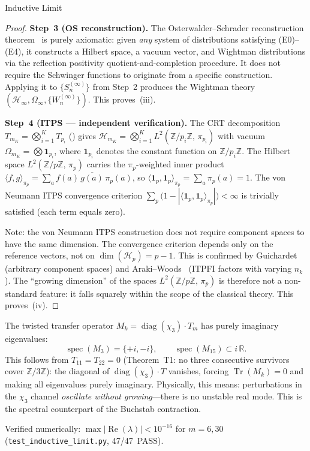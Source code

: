 \documentclass[12pt,a4paper]{article}
\begin{document}
\begin{thmbox}{Inductive Limit}
\begin{proof}
\textbf{Step~3 (OS reconstruction).}
The Osterwalder--Schrader reconstruction
theorem~\cite{OsterwalderSchrader1973,OsterwalderSchrader1975}
is purely axiomatic: given \emph{any} system of distributions
satisfying (E0)--(E4), it constructs a Hilbert space, a vacuum
vector, and Wightman distributions via the reflection positivity
quotient-and-completion procedure.  It does not require the Schwinger
functions to originate from a specific construction.
Applying it to $\{S_n^{(\infty)}\}$ from Step~2 produces
the Wightman theory $(\mathcal{H}_\infty, \Omega_\infty,
\{W_n^{(\infty)}\})$.  This proves~(iii).

\textbf{Step~4 (ITPS --- independent verification).}
The CRT decomposition $T_{m_K} = \bigotimes_{i=1}^K T_{p_i}$
(\cite{companion_M1})
gives $\mathcal{H}_{m_K} = \bigotimes_{i=1}^K
  L^2(\mathbb{Z}/p_i\mathbb{Z},\,\pi_{p_i})$
with vacuum $\Omega_{m_K} = \bigotimes \mathbf{1}_{p_i}$,
where $\mathbf{1}_{p_i}$ denotes the constant function on
$\mathbb{Z}/p_i\mathbb{Z}$.  The Hilbert space
$L^2(\mathbb{Z}/p\mathbb{Z},\,\pi_p)$ carries the
$\pi_p$-weighted inner product
$\langle f, g \rangle_{\pi_p} = \sum_{a} f(a)\,
  \overline{g(a)}\,\pi_p(a)$,
so $\langle \mathbf{1}_p, \mathbf{1}_p \rangle_{\pi_p}
  = \sum_a \pi_p(a) = 1$.
The von Neumann ITPS convergence criterion
$\sum_p \bigl(1 - |\langle \mathbf{1}_p, \mathbf{1}_p
  \rangle_{\pi_p}|\bigr) < \infty$
is trivially satisfied (each term equals zero).

Note: the von Neumann ITPS construction does not require component
spaces to have the same dimension.  The convergence criterion
depends only on the reference vectors, not on
$\dim(\mathcal{H}_p) = p - 1$.  This is confirmed by
Guichardet~\cite{Guichardet1966} (arbitrary component spaces) and
Araki--Woods~\cite{ArakiWoods1968} (ITPFI factors with varying
$n_k$).  The ``growing dimension'' of the spaces
$L^2(\mathbb{Z}/p\mathbb{Z},\,\pi_p)$ is therefore not a
non-standard feature: it falls squarely within the scope of the
classical theory.  This proves~(iv).
\end{proof}
\end{thmbox}

\begin{remark}\mBR
\label{rem:imag_spectrum}
The twisted transfer operator $M_k = \operatorname{diag}(\chi_3)
\cdot T_m$ has purely imaginary eigenvalues:
\[
  \operatorname{spec}(M_3) = \{+i, -i\},
  \qquad
  \operatorname{spec}(M_{15}) \subset i\,\mathbb{R}.
\]
This follows from $T_{11} = T_{22} = 0$
(Theorem~T1: no three consecutive survivors cover $\mathbb{Z}/3\mathbb{Z}$):
the diagonal of $\operatorname{diag}(\chi_3) \cdot T$ vanishes,
forcing $\operatorname{Tr}(M_k) = 0$ and making all eigenvalues
purely imaginary.  Physically, this means: perturbations in the
$\chi_3$ channel \emph{oscillate without growing}---there is no
unstable real mode.  This is the spectral counterpart of the Buchstab
contraction.

Verified numerically: $\max|\operatorname{Re}(\lambda)| < 10^{-16}$
for $m = 6, 30$ (\texttt{test\_inductive\_limit.py}, 47/47~PASS).
\end{remark}
\end{document}
